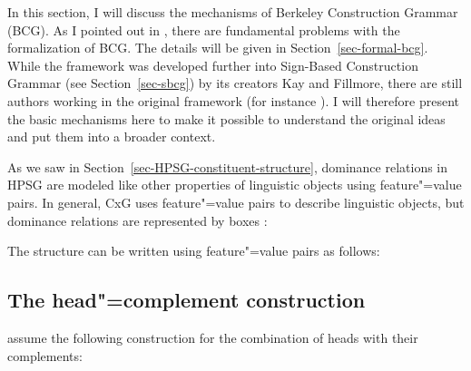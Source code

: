 In this section, I will discuss the mechanisms of Berkeley Construction Grammar (BCG). As I pointed out in
, there are fundamental problems with the formalization of BCG. The details will
be given in Section~\ref{sec-formal-bcg}. While the framework was developed further into Sign-Based Construction Grammar (see Section~\ref{sec-sbcg}) by its creators Kay
and Fillmore, there are still authors working in the original framework (for instance \citealp{Fried2013a-u}). I will therefore present the basic mechanisms here to make it possible
to understand the original ideas and put them into a broader context.

As we saw in Section~\ref{sec-HPSG-constituent-structure}, dominance relations in HPSG are modeled like other properties of linguistic objects using feature"=value
pairs. In general, CxG uses feature"=value pairs to describe linguistic objects, but dominance relations are represented by boxes \citep{KF99a,Goldberg2003a}: 

\ea
\setlength{\fboxsep}{2mm}
\z
The structure can be written using feature"=value pairs as follows:

\ea
{}
\z


\subsection{The head"=complement construction}

\citet{KF99a} assume the following construction for the combination of heads with their complements:

